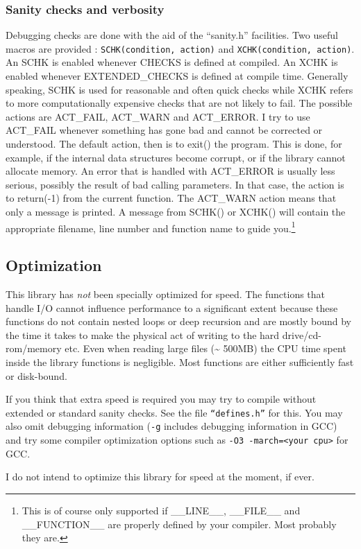 \documentclass[12pt, a4paper]{article}
\begin{document}
\subsubsection{Sanity checks and verbosity}
Debugging checks are done with the aid of the ``sanity.h'' facilities.
Two useful macros are provided : \texttt{SCHK(condition, action)} and 
\texttt{XCHK(condition, action)}. An SCHK is enabled whenever CHECKS is defined at
compiled. An XCHK is enabled whenever EXTENDED\_CHECKS is defined at compile time.
Generally speaking, SCHK is used for reasonable and often quick checks while XCHK
refers to more computationally expensive checks that are not likely to fail. The possible
actions are ACT\_FAIL, ACT\_WARN and ACT\_ERROR. I try to use ACT\_FAIL whenever something
has gone bad and cannot be corrected or understood. The default action, then is to 
exit() the program. This is done, for example, if the internal data structures
become corrupt, or if the library cannot allocate memory. An error that is
handled with ACT\_ERROR is usually less serious, possibly the result of bad calling
parameters. In that case, the action is to return(-1) from the current function.
The ACT\_WARN action means that only a message is printed. A message from SCHK() or
XCHK() will contain the appropriate filename, line number and function name to
guide you.\footnote{This is of course only supported if \_\_LINE\_\_, \_\_FILE\_\_ 
and \_\_FUNCTION\_\_ are properly defined by your compiler. Most probably they are.}

\subsection{Optimization}
 This library has \emph{not} been specially optimized for speed. The functions
that handle I/O cannot influence performance to a significant extent because
these functions do not contain nested loops or deep recursion and are mostly
bound by the time it takes to make the physical act of writing to the hard
drive/cd-rom/memory etc. Even when reading large files (\~{} 500MB) the CPU time
spent inside the library functions is negligible. Most functions are either
sufficiently fast or disk-bound.

 If you think that extra speed is required you may try to compile without
extended or standard sanity checks. See the file \texttt{``defines.h''} for this.
You may also omit debugging information (\texttt{-g} includes debugging 
information in GCC) and try some compiler optimization options such as
\texttt{-O3 -march=<your cpu>} for GCC.

 I do not intend to optimize this library for speed at the moment, if ever. 
\end{document}
